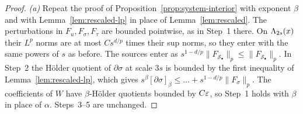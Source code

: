 \begin{proof}
\emph{(a)} Repeat the proof of Proposition~\ref{prop:system-interior} with exponent $\beta$ and with Lemma~\ref{lem:rescaled-lp} in place of Lemma~\ref{lem:rescaled}. The perturbations in $F_u,F_\sigma,F_\tau$ are bounded pointwise, as in Step~1 there. On $\Lambda_{2s}(x)$ their $L^p$ norms are at most $Cs^{d/p}$ times their sup norms, so they enter with the same powers of $s$ as before. The sources enter as $s^{1-d/p}\|F_{\mathcal S_\bullet}\|_p\le\|F_{\mathcal S_\bullet}\|_p$. In Step~2 the H\"older quotient of $\partial\sigma$ at scale $3s$ is bounded by the first inequality of Lemma~\ref{lem:rescaled-lp}, which gives $s^\beta[\partial\sigma]_\beta\le\dots+s^{1-d/p}\|F_\sigma\|_p$. The coefficients of $W$ have $\beta$-H\"older quotients bounded by $C\varepsilon$, so Step~1 holds with $\beta$ in place of $\alpha$. Steps~3--5 are unchanged.


\end{proof}
